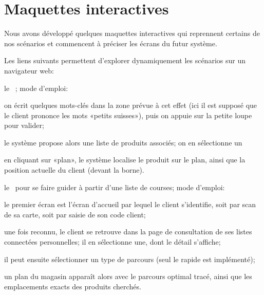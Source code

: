 \chapter{Maquettes interactives}

Nous avons développé quelques maquettes interactives qui reprennent certains de nos scénarios et commencent à préciser les écrans du futur système.


Les liens suivants permettent d'explorer dynamiquement les scénarios sur un navigateur web:
\startitemize
\item le \cu\ \from[BE]; mode d'emploi:
    \startitemize[n]
    \item on écrit quelques mots-clés dans la zone prévue à cet effet (ici il est supposé que le client prononce les mots «petits suisses»), puis on appuie sur la petite loupe pour valider;
    \item le système propose alors une liste de produits associés; on en sélectionne un
    \item en cliquant sur «plan», le système localise le produit sur le plan, ainsi que la position actuelle du client (devant la borne).
    \stopitemize
\item le \cu\ \from[GUIDE] pour se faire guider à partir d'une liste de courses; mode d'emploi:
    \startitemize[n]
\item le premier écran est l'écran d'accueil par lequel le client s'identifie, soit par scan de sa carte, soit par saisie de son code client;
\item une fois reconnu, le client se retrouve dans la page de consultation de ses listes connectées personnelles; il en sélectionne une, dont le détail s'affiche;
\item il peut ensuite sélectionner un type de parcours (seul le rapide est implémenté);
\item un plan du magasin apparaît alors avec le parcours optimal tracé, ainsi que les emplacements exacts des produits cherchés.
    \stopitemize

